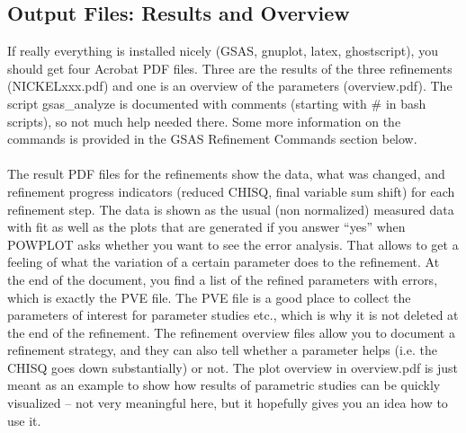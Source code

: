 \subsection{Output Files: Results and Overview}
If really everything is installed nicely (GSAS, gnuplot, latex, ghostscript), you should get four Acrobat PDF files. Three are the results of the three refinements (NICKELxxx.pdf) and one is an overview of the parameters (overview.pdf). The script gsas\_analyze is documented with comments (starting with \# in bash scripts), so not much help needed there. Some more information on the commands is provided in the GSAS Refinement Commands section below. \\ \\
The result PDF files for the refinements show  the data, what was changed, and refinement progress indicators (reduced CHISQ, final variable sum shift) for each refinement step. The data is shown as the usual (non normalized) measured data with fit as well as the plots that are generated if you answer ``yes'' when POWPLOT asks whether you want to see the error analysis. That allows to get a feeling of what the variation of a certain parameter does to the refinement. At the end of the document, you find a list of the refined parameters with errors, which is exactly the PVE file. The PVE file is a good place to collect the parameters of interest for parameter studies etc., which is why it is not deleted at the end of the refinement. The refinement overview files allow you to document a refinement strategy, and they can also tell whether a parameter helps (i.e. the CHISQ goes down substantially) or not. The plot overview in overview.pdf is just meant as an example to show how results of parametric studies can be quickly visualized -- not very meaningful here, but it hopefully gives you an idea how to use it.

